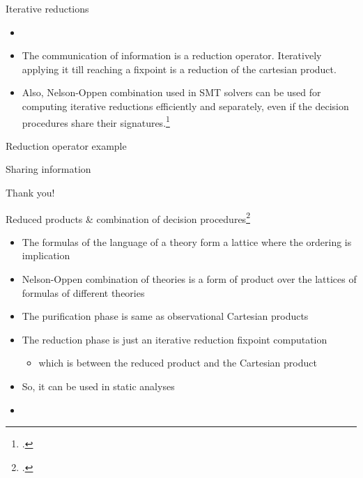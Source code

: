 \documentclass[aspectratio=169]{beamer}
\begin{document}
\begin{frame}{Iterative reductions}
  \small
  \begin{itemize}
  \item {}
  \item The communication of information is a reduction operator. Iteratively applying it till reaching a fixpoint is a reduction of the cartesian product.
  \item Also, Nelson-Oppen combination used in SMT solvers can be used for computing iterative reductions efficiently and separately, even if the decision procedures share their signatures.\footcite{cousot2011reduced}
  \end{itemize}
\end{frame}

\begin{frame}{Reduction operator example}
  \item {}
  \item {}
\end{frame}

\begin{frame}{Sharing information}
\end{frame}

\begin{frame}[standout]
  Thank you!
\end{frame}

\appendix

\begin{frame}{Reduced products \& combination of decision procedures\footcite{cousot2011reduced}}
  \footnotesize
  \begin{itemize}
  \item The formulas of the language of a theory form a lattice where the ordering is implication
  \item Nelson-Oppen combination of theories is a form of product over the lattices of formulas of different theories
  \item The purification phase is same as observational Cartesian products
  \item The reduction phase is just an iterative reduction fixpoint computation
    \begin{itemize}
    \item which is between the reduced product and the Cartesian product
    \end{itemize}
  \item So, it can be used in static analyses
  \item {}
  \end{itemize}
\end{frame}
\end{document}
